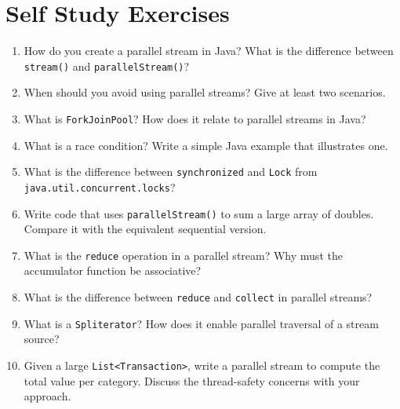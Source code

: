 \documentclass[twoside=false,DIV=14]{scrartcl}
\begin{document}
\section*{Self Study Exercises}
\begin{enumerate}
\item How do you create a parallel stream in Java?  What is the difference between \texttt{stream()} and \texttt{parallelStream()}?

\item When should you avoid using parallel streams?  Give at least two scenarios.

\item What is \texttt{ForkJoinPool}?  How does it relate to parallel streams in Java?

\item What is a race condition?  Write a simple Java example that illustrates one.

\item What is the difference between \texttt{synchronized} and \texttt{Lock} from \texttt{java.util.concurrent.locks}?

\item Write code that uses \texttt{parallelStream()} to sum a large array of doubles.  Compare it with the equivalent sequential version.

\item What is the \texttt{reduce} operation in a parallel stream?  Why must the accumulator function be associative?

\item What is the difference between \texttt{reduce} and \texttt{collect} in parallel streams?

\item What is a \texttt{Spliterator}?  How does it enable parallel traversal of a stream source?

\item Given a large \texttt{List<Transaction>}, write a parallel stream to compute the total value per category.  Discuss the thread-safety concerns with your approach.
\end{enumerate}
\end{document}
